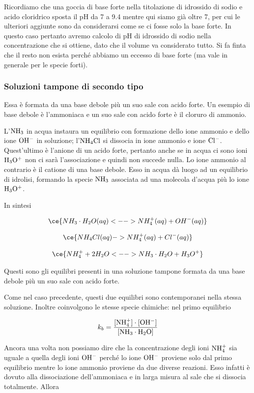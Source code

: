 Ricordiamo che una goccia di base forte nella titolazione di idrossido di sodio e acido cloridrico sposta il pH da 7 a 9.4 mentre qui siamo già oltre 7, per cui le ulteriori aggiunte sono da considerarsi come se ci fosse solo la base forte. In questo caso pertanto avremo calcolo di pH di idrossido di sodio nella concentrazione che si ottiene, dato che il volume va considerato tutto. Si fa finta che il resto non esista perché abbiamo un eccesso di base forte (ma vale in generale per le specie forti).

\subsubsection{Soluzioni tampone di secondo tipo}
Essa è formata da una base debole più un suo sale con acido forte. Un esempio di base debole è l'ammoniaca e un suo sale con acido forte è il cloruro di ammonio.

L'$\rm NH_3$ in acqua instaura un equilibrio con formazione dello ione ammonio e dello ione $\rm OH^-$ in soluzione; l'$\rm NH_4Cl$ si dissocia in ione ammonio e ione $\rm Cl^-$. Quest'ultimo è l'anione di un acido forte, pertanto anche se in acqua ci sono ioni $\rm H_3O^+$ non ci sarà l'associazione e quindi non succede nulla. Lo ione ammonio al contrario è il catione di una base debole. Esso in acqua dà luogo ad un equilibrio di idrolisi, formando la specie $\rm NH_3$ associata ad una molecola d'acqua più lo ione $\rm H_3O^+$.

In sintesi

$$\ce{NH_3 \cdot H_2O(aq) <--> NH_4^+(aq) + OH^-(aq)}$$

$$\ce{NH_4Cl(aq) -> NH_4^+(aq) + Cl^-(aq)}$$

$$\ce{NH_4^+ + 2H_2O <--> NH_3 \cdot H_2O + H_3O^+}$$

Questi sono gli equilibri presenti in una soluzione tampone formata da una base debole più un suo sale con acido forte.

Come nel caso precedente, questi due equilibri sono contemporanei nella stessa soluzione. Inoltre coinvolgono le stesse specie chimiche: nel primo equilibrio

$$k_b = \rm{\frac{[NH_4^+] \cdot [OH^-]}{[NH_3 \cdot H_2O]}}$$

Ancora una volta non possiamo dire che la concentrazione degli ioni $\rm NH_4^+$ sia uguale a quella degli ioni $\rm OH^-$ perché lo ione $\rm OH^-$ proviene solo dal primo equilibrio mentre lo ione ammonio proviene da due diverse reazioni. Esso infatti è dovuto alla dissociazione dell'ammoniaca e in larga misura al sale che si dissocia totalmente. Allora 

